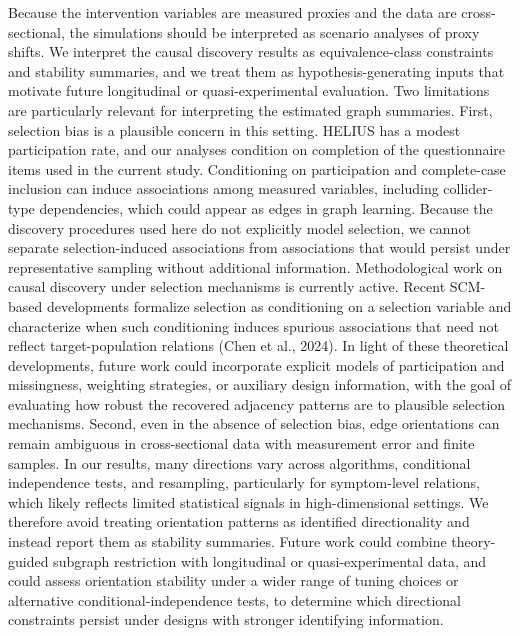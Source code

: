 \documentclass[
]{article}
\begin{document}
\textcolor{BrickRed}{Because the intervention variables are measured proxies and the data are cross-sectional, the simulations should be interpreted as scenario analyses of proxy shifts.}
\textcolor{BrickRed}{We interpret the causal discovery results as equivalence-class constraints and stability summaries, and we treat them as hypothesis-generating inputs that motivate future longitudinal or quasi-experimental evaluation.}
\textcolor{BrickRed}{Two limitations are particularly relevant for interpreting the estimated graph summaries. First, selection bias is a plausible concern in this setting. HELIUS has a modest participation rate, and our analyses condition on completion of the questionnaire items used in the current study. Conditioning on participation and complete-case inclusion can induce associations among measured variables, including collider-type dependencies, which could appear as edges in graph learning. Because the discovery procedures used here do not explicitly model selection, we cannot separate selection-induced associations from associations that would persist under representative sampling without additional information. Methodological work on causal discovery under selection mechanisms is currently active. Recent SCM-based developments formalize selection as conditioning on a selection variable and characterize when such conditioning induces spurious associations that need not reflect target-population relations}
(Chen et al., 2024).
\textcolor{BrickRed}{In light of these theoretical developments, future work could incorporate explicit models of participation and missingness, weighting strategies, or auxiliary design information, with the goal of evaluating how robust the recovered adjacency patterns are to plausible selection mechanisms.}
\textcolor{BrickRed}{Second, even in the absence of selection bias, edge orientations can remain ambiguous in cross-sectional data with measurement error and finite samples. In our results, many directions vary across algorithms, conditional independence tests, and resampling, particularly for symptom-level relations, which likely reflects limited statistical signals in high-dimensional settings. We therefore avoid treating orientation patterns as identified directionality and instead report them as stability summaries. 
Future work could combine theory-guided subgraph restriction with longitudinal or quasi-experimental data, and could assess orientation stability under a wider range of tuning choices or alternative conditional-independence tests, to determine which directional constraints persist under designs with stronger identifying information.}
\end{document}

